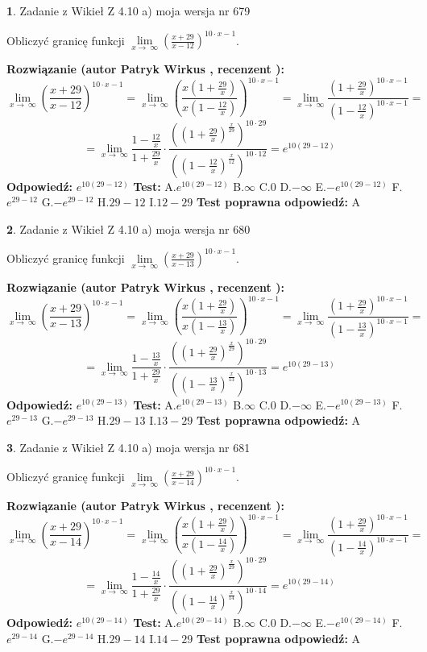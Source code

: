 \documentclass[12pt, a4paper]{article}
\theoremstyle{definition} %
\newtheorem{zad}{}
\newcommand{\zadStart}[1]{\begin{zad}#1\newline}
\newcommand{\zadStop}{\end{zad}}
\newcommand{\rozwStart}[2]{\noindent \textbf{Rozwiązanie (autor #1 , recenzent #2): }\newline}
\newcommand{\rozwStop}{\newline}
\newcommand{\odpStart}{\noindent \textbf{Odpowiedź:}\newline}
\newcommand{\odpStop}{\newline}
\newcommand{\testStart}{\noindent \textbf{Test:}\newline}
\newcommand{\testStop}{\newline}
\newcommand{\kluczStart}{\noindent \textbf{Test poprawna odpowiedź:}\newline}
\newcommand{\kluczStop}{\newline}
\begin{document}
\zadStart{Zadanie z Wikieł Z 4.10 a) moja wersja nr 679}


Obliczyć granicę funkcji  $\lim\limits_{x\to\ \infty}(\frac{x+29}{x-12})^{10\cdot x-1}$.
\zadStop
\rozwStart{Patryk Wirkus}{}
$$\lim\limits_{x\to\ \infty}(\frac{x+29}{x-12})^{10\cdot x-1} = \lim\limits_{x\to\ \infty}(\frac{x(1+\frac{29}{x})}{x(1-\frac{12}{x})})^{10\cdot x-1}=\lim\limits_{x\to\ \infty}\frac{(1+\frac{29}{x})^{10\cdot x-1}}{(1-\frac{12}{x})^{10\cdot x-1}}=$$
$$=\lim\limits_{x\to\ \infty}\frac{1-\frac{12}{x}}{1+\frac{29}{x}}\cdot\frac{((1+\frac{29}{x})^{\frac{x}{29}})^{10\cdot29}}{((1-\frac{12}{x})^{\frac{x}{12}})^{10\cdot12}}=e^{10(29-12)}$$
\rozwStop
\odpStart
$e^{10(29-12)}$
\odpStop
\testStart
A.$e^{10(29-12)}$ B.$\infty$ C.$0$ D.$-\infty$ E.$-e^{10(29-12)}$
F.$e^{29-12}$ G.$-e^{29-12}$
H.$29-12$
I.$12-29$
\testStop
\kluczStart
A
\kluczStop



\zadStart{Zadanie z Wikieł Z 4.10 a) moja wersja nr 680}


Obliczyć granicę funkcji  $\lim\limits_{x\to\ \infty}(\frac{x+29}{x-13})^{10\cdot x-1}$.
\zadStop
\rozwStart{Patryk Wirkus}{}
$$\lim\limits_{x\to\ \infty}(\frac{x+29}{x-13})^{10\cdot x-1} = \lim\limits_{x\to\ \infty}(\frac{x(1+\frac{29}{x})}{x(1-\frac{13}{x})})^{10\cdot x-1}=\lim\limits_{x\to\ \infty}\frac{(1+\frac{29}{x})^{10\cdot x-1}}{(1-\frac{13}{x})^{10\cdot x-1}}=$$
$$=\lim\limits_{x\to\ \infty}\frac{1-\frac{13}{x}}{1+\frac{29}{x}}\cdot\frac{((1+\frac{29}{x})^{\frac{x}{29}})^{10\cdot29}}{((1-\frac{13}{x})^{\frac{x}{13}})^{10\cdot13}}=e^{10(29-13)}$$
\rozwStop
\odpStart
$e^{10(29-13)}$
\odpStop
\testStart
A.$e^{10(29-13)}$ B.$\infty$ C.$0$ D.$-\infty$ E.$-e^{10(29-13)}$
F.$e^{29-13}$ G.$-e^{29-13}$
H.$29-13$
I.$13-29$
\testStop
\kluczStart
A
\kluczStop



\zadStart{Zadanie z Wikieł Z 4.10 a) moja wersja nr 681}


Obliczyć granicę funkcji  $\lim\limits_{x\to\ \infty}(\frac{x+29}{x-14})^{10\cdot x-1}$.
\zadStop
\rozwStart{Patryk Wirkus}{}
$$\lim\limits_{x\to\ \infty}(\frac{x+29}{x-14})^{10\cdot x-1} = \lim\limits_{x\to\ \infty}(\frac{x(1+\frac{29}{x})}{x(1-\frac{14}{x})})^{10\cdot x-1}=\lim\limits_{x\to\ \infty}\frac{(1+\frac{29}{x})^{10\cdot x-1}}{(1-\frac{14}{x})^{10\cdot x-1}}=$$
$$=\lim\limits_{x\to\ \infty}\frac{1-\frac{14}{x}}{1+\frac{29}{x}}\cdot\frac{((1+\frac{29}{x})^{\frac{x}{29}})^{10\cdot29}}{((1-\frac{14}{x})^{\frac{x}{14}})^{10\cdot14}}=e^{10(29-14)}$$
\rozwStop
\odpStart
$e^{10(29-14)}$
\odpStop
\testStart
A.$e^{10(29-14)}$ B.$\infty$ C.$0$ D.$-\infty$ E.$-e^{10(29-14)}$
F.$e^{29-14}$ G.$-e^{29-14}$
H.$29-14$
I.$14-29$
\testStop
\kluczStart
A
\kluczStop
\end{document}

